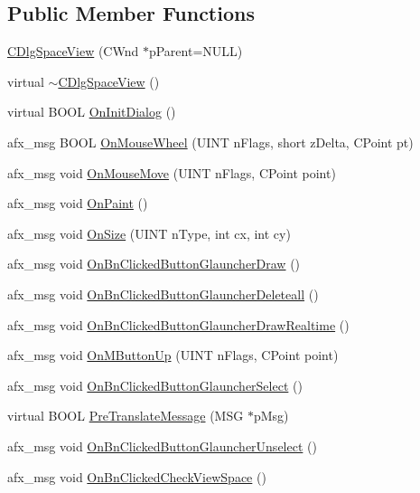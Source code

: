 \subsection*{Public Member Functions}
\begin{DoxyCompactItemize}
\item 
\hyperlink{class_c_dlg_space_view_aa6ed76323b085fe5606741e60d35bc26}{C\+Dlg\+Space\+View} (C\+Wnd $\ast$p\+Parent=N\+U\+L\+L)
\item 
virtual \hyperlink{class_c_dlg_space_view_aac9f68d7331900a0f3cb7d837c2a6cf3}{$\sim$\+C\+Dlg\+Space\+View} ()
\item 
virtual B\+O\+O\+L \hyperlink{class_c_dlg_space_view_ae93c3243d1afe9c70d1494076d0949fd}{On\+Init\+Dialog} ()
\item 
afx\+\_\+msg B\+O\+O\+L \hyperlink{class_c_dlg_space_view_ae6a6ce31d5ae3ae3281b988514708fad}{On\+Mouse\+Wheel} (U\+I\+N\+T n\+Flags, short z\+Delta, C\+Point pt)
\item 
afx\+\_\+msg void \hyperlink{class_c_dlg_space_view_a3f8f174cf2d1d481a3ebf181cdf3430d}{On\+Mouse\+Move} (U\+I\+N\+T n\+Flags, C\+Point point)
\item 
afx\+\_\+msg void \hyperlink{class_c_dlg_space_view_aeca76e948efcb1e10f1d017eb89c07c0}{On\+Paint} ()
\item 
afx\+\_\+msg void \hyperlink{class_c_dlg_space_view_a0aff9931836f4c83f095cee222027029}{On\+Size} (U\+I\+N\+T n\+Type, int cx, int cy)
\item 
afx\+\_\+msg void \hyperlink{class_c_dlg_space_view_a80d02543987e3873609223ffc2c5303b}{On\+Bn\+Clicked\+Button\+Glauncher\+Draw} ()
\item 
afx\+\_\+msg void \hyperlink{class_c_dlg_space_view_a385632c587c9d85c0658867918c21665}{On\+Bn\+Clicked\+Button\+Glauncher\+Deleteall} ()
\item 
afx\+\_\+msg void \hyperlink{class_c_dlg_space_view_ae88c08bc7d961550d96a4cf1edfc3b1a}{On\+Bn\+Clicked\+Button\+Glauncher\+Draw\+Realtime} ()
\item 
afx\+\_\+msg void \hyperlink{class_c_dlg_space_view_a6c6a50227ebf2f16af1dc8f8421d7bb0}{On\+M\+Button\+Up} (U\+I\+N\+T n\+Flags, C\+Point point)
\item 
afx\+\_\+msg void \hyperlink{class_c_dlg_space_view_a67afedad0df5d66dfdec4a9a74163607}{On\+Bn\+Clicked\+Button\+Glauncher\+Select} ()
\item 
virtual B\+O\+O\+L \hyperlink{class_c_dlg_space_view_aa04e7e9124754e71e539bbf0fad11a85}{Pre\+Translate\+Message} (M\+S\+G $\ast$p\+Msg)
\item 
afx\+\_\+msg void \hyperlink{class_c_dlg_space_view_ab304735a99bf753c528431451d1a549e}{On\+Bn\+Clicked\+Button\+Glauncher\+Unselect} ()
\item 
afx\+\_\+msg void \hyperlink{class_c_dlg_space_view_a10493793bce8ab7961223649a00cc4f3}{On\+Bn\+Clicked\+Check\+View\+Space} ()
\end{DoxyCompactItemize}
